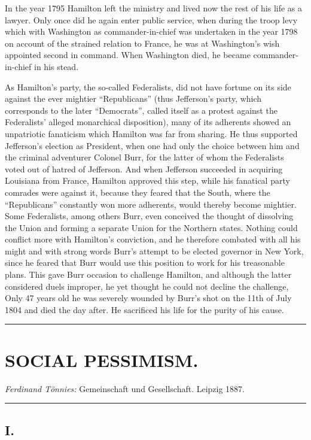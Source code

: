 \documentclass[12pt,a4paper,openany]{book}
\newcommand{\opage}[1]{\marginnote{\footnotesize\textit{[#1]}}}
\newcommand{\essay}[2][]{\chapter*{#2}\addcontentsline{toc}{chapter}{#1}}
\newcommand{\streg}{\begin{center}\rule{3em}{0.4pt}\end{center}}
\begin{document}
In the year 1795 Hamilton left the ministry and
lived now the rest of his life as a lawyer. Only once did
he again enter public service, when during the troop
\opage{141}levy which with Washington as commander-in-chief was undertaken in
the year 1798 on account of the strained relation to France,
he was at Washington's wish appointed second in command.
When Washington died, he became commander-in-chief in his stead.

As Hamilton's party, the so-called Federalists, did not
have fortune on its side against the ever mightier
``Republicans'' (thus Jefferson's party, which corresponds to the
later ``Democrats'', called itself as a protest against the Federalists'
alleged monarchical disposition), many of its adherents showed
an unpatriotic fanaticism which Hamilton was far from sharing.
He thus supported Jefferson's election as President, when one
had only the choice between him and the criminal
adventurer Colonel Burr, for the latter of whom the Federalists voted
out of hatred of Jefferson. And when Jefferson succeeded in
acquiring Louisiana from France, Hamilton approved this
step, while his fanatical party comrades were against it,
because they feared that the South, where the ``Republicans'' constantly
won more adherents, would thereby become mightier. Some
Federalists, among others Burr, even conceived the thought of
dissolving the Union and forming a separate Union for the Northern states.
Nothing could conflict more with Hamilton's conviction, and
he therefore combated with all his might and with strong words Burr's
attempt to be elected governor in New York, since he
feared that Burr would use this position to work
for his treasonable plans. This gave Burr occasion
to challenge Hamilton, and although the latter considered duels
improper, he yet thought he could not decline the challenge,
Only 47 years old he was severely wounded by Burr's shot
on the 11th of July 1804 and died the day after. He sacrificed his life
for the purity of his cause.

\streg{}

\opage{142}
\essay[Social Pessimism]{SOCIAL PESSIMISM.}

\begin{center}\emph{Ferdinand Tönnies:} Gemeinschaft und Gesellschaft. Leipzig 1887.\end{center}

\streg{}

\section*{I.}
\end{document}
